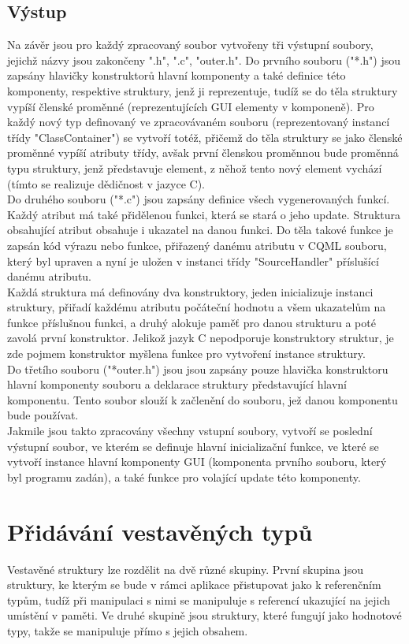\documentclass[report,11pt]{elsarticle}
\begin{document}
\subsection{Výstup}
Na závěr jsou pro každý zpracovaný soubor vytvořeny tři výstupní soubory, jejichž názvy jsou zakončeny ".h", ".c", "outer.h". 
Do prvního souboru ("*.h") jsou zapsány hlavičky konstruktorů hlavní komponenty a také definice této komponenty, respektive struktury, jenž ji reprezentuje, tudíž se do těla struktury vypíší členské proměnné (reprezentujících GUI elementy v komponeně). Pro každý nový typ definovaný ve zpracovávaném souboru (reprezentovaný instancí třídy "ClassContainer") se vytvoří totéž, přičemž do těla struktury se jako členské proměnné vypíší atributy třídy, avšak první členskou proměnnou bude proměnná typu struktury, jenž představuje element, z něhož tento nový element vychází (tímto se realizuje dědičnost v jazyce C).\\
Do druhého souboru ("*.c") jsou zapsány definice všech vygenerovaných funkcí. Každý atribut má také přidělenou funkci, která se stará o jeho update. Struktura obsahující atribut obsahuje i ukazatel na danou funkci. Do těla takové funkce je zapsán kód výrazu nebo funkce, přiřazený danému atributu v CQML souboru, který byl upraven a nyní je uložen v instanci třídy "SourceHandler" příslušící danému atributu.\\
Každá struktura má definovány dva konstruktory, jeden inicializuje instanci struktury, přiřadí každému atributu počáteční hodnotu a všem ukazatelům na funkce příslušnou funkci, a druhý alokuje paměť pro danou strukturu a poté zavolá první konstruktor. Jelikož jazyk C nepodporuje konstruktory struktur, je zde pojmem konstruktor myšlena funkce pro vytvoření instance struktury.\\
Do třetího souboru ("*outer.h") jsou jsou zapsány pouze hlavička konstruktoru hlavní komponenty souboru a deklarace struktury představující hlavní komponentu. Tento soubor slouží k začlenění do souboru, jež danou komponentu bude používat.\\
Jakmile jsou takto zpracovány všechny vstupní soubory, vytvoří se poslední výstupní soubor, ve kterém se definuje hlavní inicializační funkce, ve které se vytvoří instance hlavní komponenty GUI (komponenta prvního souboru, který byl programu zadán), a také funkce pro volající update této komponenty.\\

\section{\label{SEC:macI}Přidávání vestavěných typů}
Vestavěné struktury lze rozdělit na dvě různé skupiny. První skupina jsou struktury, ke kterým se bude v rámci aplikace přistupovat jako k referenčním typům, tudíž při manipulaci s nimi se manipuluje s referencí ukazující na jejich umístění v paměti. Ve druhé skupině jsou struktury, které fungují jako hodnotové typy, takže se manipuluje přímo s jejich obsahem.\\
\end{document}
